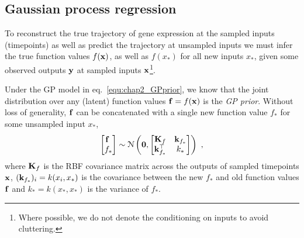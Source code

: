     \subsection{Gaussian process regression} \label{subsec:chap2_GPprediction}
      To reconstruct the true trajectory of gene expression at the sampled inputs (timepoints)
      as well as predict the trajectory at unsampled inputs we must
      infer the true function values $f(\mathbf{x})$, as well as $f(x_*)$ for all new inputs $x_*$,
      given some observed outputs $\mathbf{y}$ at sampled inputs
      $\mathbf{x}$\footnote{Where possible, we do not denote the conditioning on inputs to avoid cluttering.}.

      Under the GP model in eq.~\eqref{equ:chap2_GPprior}, we know that the
      joint distribution over any (latent) function values $\mathbf{f} = f(\mathbf{x})$ is the \textit{GP prior}.
      Without loss of generality, $\mathbf{f}$ can be concatenated with a single new function
      value $f_*$ for some unsampled input $x_*$,
      \begin{equation*}
	\begin{bmatrix}  \mathbf{f}_{~} \\ f_*  \end{bmatrix} \sim \mathcal{N} \left(  \mathbf{0} ,  \begin{bmatrix}  \mathbf{K}_f &\mathbf{k}_{f_*} \\ \mathbf{k}_{f_*}^\top &k_*  \end{bmatrix}  \right) ~,
      \end{equation*}
      where $\mathbf{K}_f$ is the RBF covariance matrix across the outputs of sampled timepoints $\mathbf{x}$,
      $(\mathbf{k}_{f_*})_i = k(x_i, x_*)$ is the covariance between the new $f_*$
      and old function values $\mathbf{f}$ and $k_* = k(x_*,x_*)$ is the variance of $f_*$.

